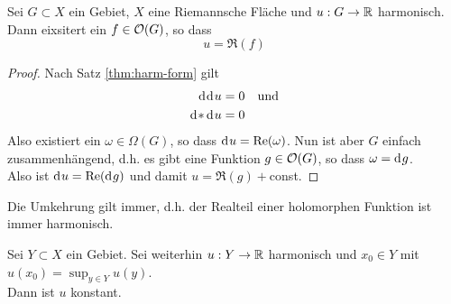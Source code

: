 \begin{prop}
  \label{prop:harm-realteil-hol}
  Sei $G \subset X$ ein Gebiet, $X$ eine Riemannsche Fläche
  und $u: G \rightarrow \mathbb{R}$ harmonisch. \\
  Dann eixsitert ein $f \in \mathcal{O}(G)$, so dass
  \[
  u = \Re(f)
  \]
\end{prop}

\begin{proof}
  Nach Satz \ref{thm:harm-form} gilt
  \begin{align*}
    \d[\d[u]] & = 0 && \text{und}\\
    \d[\ast\d[u]] & = 0
  \end{align*}
  Also existiert ein $\omega \in \Omega(G)$, so dass $\d[u] =
  \Re(\omega)$. Nun ist aber $G$ einfach zusammenhängend, d.h. es gibt
  eine Funktion $g \in \mathcal{O}(G)$, so dass $\omega = \d[g]$.\\
  Also ist $\d[u] = \Re(\d[g])$ und damit $u = \Re(g) +$const.
\end{proof}

\begin{rem}
  Die Umkehrung gilt immer, d.h. der Realteil einer holomorphen
  Funktion ist immer harmonisch.
\end{rem}

\begin{prop}
  \label{prop:max-prinzip-harm}
  Sei $Y \subset X$ ein Gebiet. Sei weiterhin $u: Y \rightarrow \mathbb{R}$ harmonisch
  und $x_0 \in Y$ mit $u(x_0) = \sup_{y \in Y} u(y)$. \\
  Dann ist $u$ konstant.
\end{prop}

